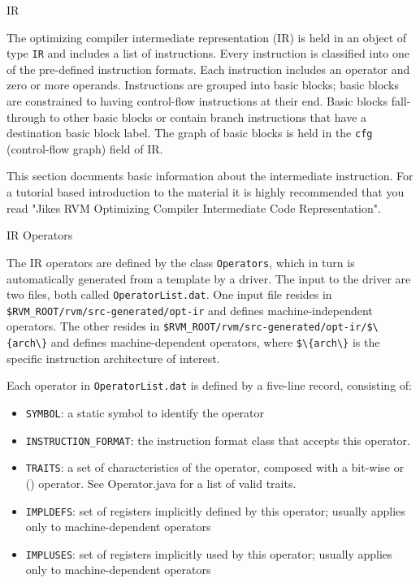 \begin{section}{IR}

The optimizing compiler intermediate representation (IR) is held in an object of type \verb#IR# and includes a list of instructions. Every instruction is classified into one of the pre-defined instruction formats. Each instruction includes an operator and zero or more operands. Instructions are grouped into basic blocks; basic blocks are constrained to having control-flow instructions at their end. Basic blocks fall-through to other basic blocks or contain branch instructions that have a destination basic block label. The graph of basic blocks is held in the \verb#cfg# (control-flow graph) field of IR.

This section documents basic information about the intermediate instruction. For a tutorial based introduction to the material it is highly recommended that you read "Jikes RVM Optimizing Compiler Intermediate Code Representation".

\begin{subsection}{IR Operators}

The IR operators are defined by the class \verb#Operators#, which in turn is automatically generated from a template by a driver. The input to the driver are two files, both called \verb#OperatorList.dat#. One input file resides in
\verb#$RVM_ROOT/rvm/src-generated/opt-ir# and defines machine-independent operators. The other resides in
\verb#$RVM_ROOT/rvm/src-generated/opt-ir/$\{arch\}# and defines machine-dependent operators, where \verb#$\{arch\}# is the specific instruction architecture of interest.

Each operator in \verb#OperatorList.dat# is defined by a five-line record, consisting of:

\begin{itemize}
  \item \verb#SYMBOL#: a static symbol to identify the operator
  \item \verb#INSTRUCTION_FORMAT#: the instruction format class that accepts this operator.
  \item \verb#TRAITS#: a set of characteristics of the operator, composed with a bit-wise or (\textbar ) operator. See Operator.java for a list of valid traits.
  \item \verb#IMPLDEFS#: set of registers implicitly defined by this operator; usually applies only to machine-dependent operators
  \item \verb#IMPLUSES#: set of registers implicitly used by this operator; usually applies only to machine-dependent operators
\end{itemize}


\end{subsection}
\end{section}
